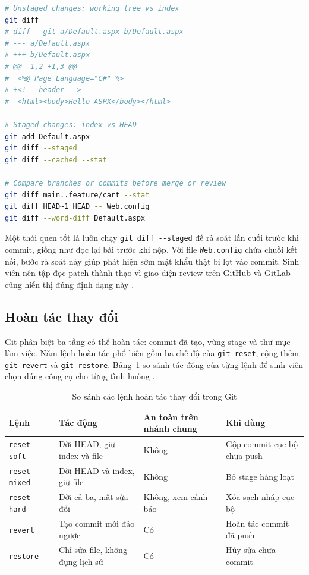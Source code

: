\begin{lstlisting}[language=bash]
# Unstaged changes: working tree vs index
git diff
# diff --git a/Default.aspx b/Default.aspx
# --- a/Default.aspx
# +++ b/Default.aspx
# @@ -1,2 +1,3 @@
#  <%@ Page Language="C#" %>
# +<!-- header -->
#  <html><body>Hello ASPX</body></html>

# Staged changes: index vs HEAD
git add Default.aspx
git diff --staged
git diff --cached --stat

# Compare branches or commits before merge or review
git diff main..feature/cart --stat
git diff HEAD~1 HEAD -- Web.config
git diff --word-diff Default.aspx
\end{lstlisting}

Một thói quen tốt là luôn chạy \verb|git diff --staged| để rà soát lần cuối trước khi commit, giống như đọc lại bài trước khi nộp.
Với file \verb|Web.config| chứa chuỗi kết nối, bước rà soát này giúp phát hiện sớm mật khẩu thật bị lọt vào commit.
Sinh viên nên tập đọc patch thành thạo vì giao diện review trên GitHub và GitLab cũng hiển thị đúng định dạng này \cite{githubdocs}.
\subsection{Hoàn tác thay đổi}
\label{subsec:c22-undo}

Git phân biệt ba tầng có thể hoàn tác: commit đã tạo, vùng stage và thư mục làm việc.
Năm lệnh hoàn tác phổ biến gồm ba chế độ của \verb|git reset|, cộng thêm \verb|git revert| và \verb|git restore|.
Bảng~\ref{tab:c22-undo} so sánh tác động của từng lệnh để sinh viên chọn đúng công cụ cho từng tình huống \cite{progit}.

\begin{table}[H]
\centering
\caption{So sánh các lệnh hoàn tác thay đổi trong Git}
\label{tab:c22-undo}
\begin{tabular}{llll}
\toprule
Lệnh & Tác động & An toàn trên nhánh chung & Khi dùng \\
\midrule
\texttt{reset --soft} & Dời HEAD, giữ index và file & Không & Gộp commit cục bộ chưa push \\
\texttt{reset --mixed} & Dời HEAD và index, giữ file & Không & Bỏ stage hàng loạt \\
\texttt{reset --hard} & Dời cả ba, mất sửa đổi & Không, xem cảnh báo & Xóa sạch nháp cục bộ \\
\texttt{revert} & Tạo commit mới đảo ngược & Có & Hoàn tác commit đã push \\
\texttt{restore} & Chỉ sửa file, không đụng lịch sử & Có & Hủy sửa chưa commit \\
\bottomrule
\end{tabular}
\end{table}

